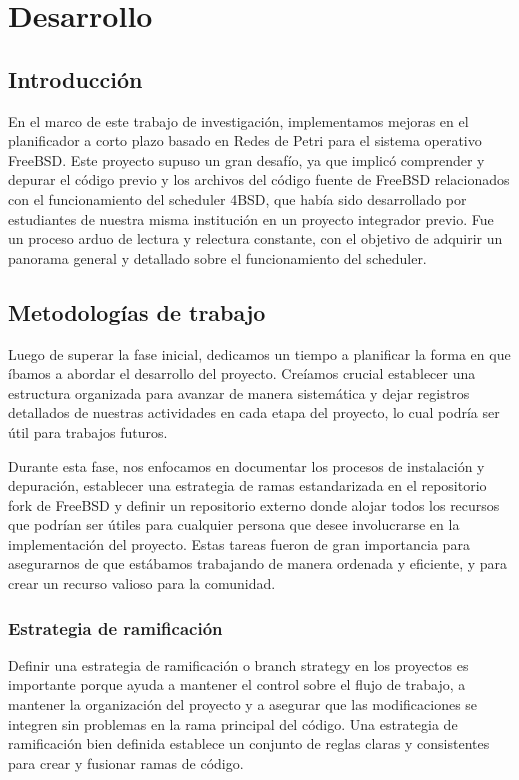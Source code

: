 \section{Desarrollo}

\subsection{Introducción}
En el marco de este trabajo de investigación, implementamos mejoras en el planificador a corto plazo basado en Redes de Petri para el sistema operativo FreeBSD. Este proyecto supuso un gran desafío, ya que implicó comprender y depurar el código previo y los archivos del código fuente de FreeBSD relacionados con el funcionamiento del scheduler 4BSD, que había sido desarrollado por estudiantes de nuestra misma institución en un proyecto integrador previo. Fue un proceso arduo de lectura y relectura constante, con el objetivo de adquirir un panorama general y detallado sobre el funcionamiento del scheduler.\par

\subsection{Metodologías de trabajo}
Luego de superar la fase inicial, dedicamos un tiempo a planificar la forma en que íbamos a abordar el desarrollo del proyecto. Creíamos crucial establecer una estructura organizada para avanzar de manera sistemática y dejar registros detallados de nuestras actividades en cada etapa del proyecto, lo cual podría ser útil para trabajos futuros.\par
Durante esta fase, nos enfocamos en documentar los procesos de instalación y depuración, establecer una estrategia de ramas estandarizada en el repositorio fork de FreeBSD y definir un repositorio externo donde alojar todos los recursos que podrían ser útiles para cualquier persona que desee involucrarse en la implementación del proyecto. Estas tareas fueron de gran importancia para asegurarnos de que estábamos trabajando de manera ordenada y eficiente, y para crear un recurso valioso para la comunidad.\par

\subsubsection{Estrategia de ramificación}
Definir una estrategia de ramificación o branch strategy en los proyectos es importante porque ayuda a mantener el control sobre el flujo de trabajo, a mantener la organización del proyecto y a asegurar que las modificaciones se integren sin problemas en la rama principal del código. Una estrategia de ramificación bien definida establece un conjunto de reglas claras y consistentes para crear y fusionar ramas de código.\par

